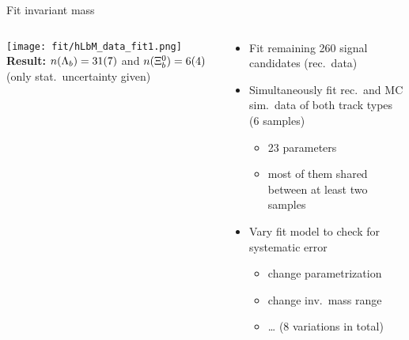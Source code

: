 \begin{frame}{Fit invariant mass}
    \begin{columns}
        \begin{column}{.55\textwidth}
            \centering
            \texttt{[image: fit/hLbM\_data\_fit1.png]}
            \textbf{Result:} $n({{\Lambda}_{b}}) = 31(7)$ and $n({{\Xi}^0_{b}}) = 6(4)$ \\ (\textcolor{vertexDarkRed}{only stat.\ uncertainty given})
        \end{column}
        \begin{column}{.45\textwidth}
            \begin{itemize}
                \item Fit remaining 260 signal candidates (rec.\ data)
                \item Simultaneously fit rec.\ and MC sim.\ data of both track types \\ (6 samples)
                \begin{itemize}
                    \item 23 parameters
                    \item most of them shared between at least two samples
                \end{itemize}
                \item Vary fit model to check for systematic error
                \begin{itemize}
                    \item change parametrization
                    \item change inv.\ mass range
                    \item \ldots{} (8 variations in total\ftntdagger)
                \end{itemize}
            \end{itemize}
        \end{column}
    \end{columns}
\end{frame}

